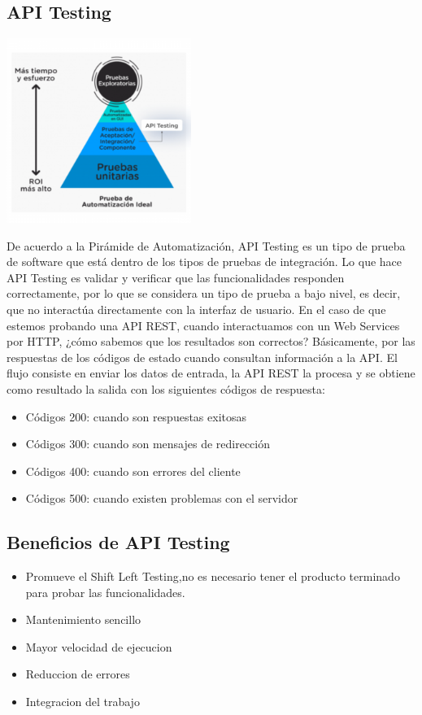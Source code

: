 \documentclass[twoside,twocolumn]{article}
\begin{document}
\subsection{API Testing}
\begin{center}
	\includegraphics[width=6cm]{./imagenes/piramide.png} 
	\end{center}
De acuerdo a la Pirámide de Automatización, API Testing es un tipo de prueba de software que está dentro de los tipos de pruebas de integración.
Lo que hace API Testing es validar y verificar que las funcionalidades responden correctamente, por lo que se considera un tipo de prueba a bajo nivel, es decir, que no interactúa directamente con la interfaz de usuario.
En el caso de que estemos probando una API REST, cuando interactuamos con un Web Services por HTTP, ¿cómo sabemos que los resultados son correctos? Básicamente, por las respuestas de los códigos de estado cuando consultan información a la API.
El flujo consiste en enviar los datos de entrada, la API REST la procesa y se obtiene como resultado la salida con los siguientes códigos de respuesta:
\begin{itemize}
    \item Códigos 200: cuando son respuestas exitosas
    \item Códigos 300: cuando son mensajes de redirección
    \item Códigos 400: cuando son errores del cliente
    \item Códigos 500: cuando existen problemas con el servidor
\end{itemize}
\subsection{Beneficios de API Testing}
\begin{itemize}
    \item Promueve el Shift Left Testing,no es necesario tener el producto terminado para probar las funcionalidades.
    \item Mantenimiento sencillo
    \item Mayor velocidad de ejecucion
    \item Reduccion de errores
    \item Integracion del trabajo
\end{itemize}
\end{document}
